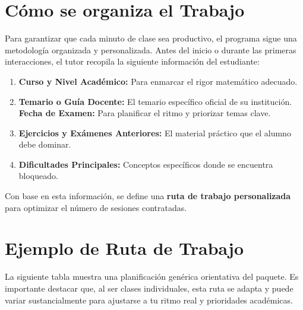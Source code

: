 \documentclass[11pt,a4paper]{article}
\begin{document}
\section{Cómo se organiza el Trabajo}
Para garantizar que cada minuto de clase sea productivo, el programa sigue una metodología organizada y personalizada. Antes del inicio o durante las primeras interacciones, el tutor recopila la siguiente información del estudiante:
\begin{enumerate}
    \item \textbf{Curso y Nivel Académico:} Para enmarcar el rigor matemático adecuado.
    \item \textbf{Temario o Guía Docente:} El temario específico oficial de su institución.
    \textbf{Fecha de Examen:} Para planificar el ritmo y priorizar temas clave.
    \item \textbf{Ejercicios y Exámenes Anteriores:} El material práctico que el alumno debe dominar.
    \item \textbf{Dificultades Principales:} Conceptos específicos donde se encuentra bloqueado.
\end{enumerate}
Con base en esta información, se define una \textbf{ruta de trabajo personalizada} para optimizar el número de sesiones contratadas.

\section{Ejemplo de Ruta de Trabajo}
La siguiente tabla muestra una planificación genérica orientativa del paquete. Es importante destacar que, al ser clases individuales, esta ruta se adapta y puede variar sustancialmente para ajustarse a tu ritmo real y prioridades académicas.
\end{document}
